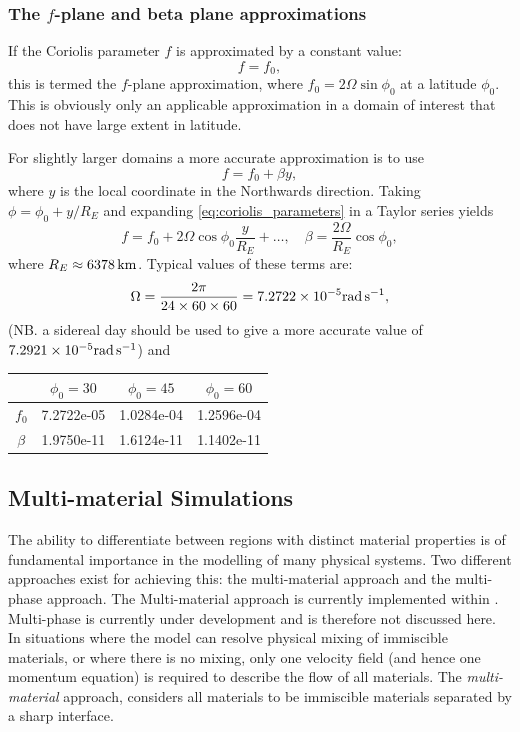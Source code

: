 \subsubsection{The $f$-plane and beta plane approximations}
If the Coriolis parameter $f$ is approximated by a constant value:
\begin{equation}\label{eq:f-plane}
f=f_0,
\end{equation}
this is termed the $f$-plane approximation, 
where $f_0 = 2\Omega\sin\phi_0$ at a latitude $\phi_0$.
This is obviously only an applicable approximation in a domain of interest 
that does not have large extent in latitude. 

For slightly larger domains a more accurate approximation is to use
\begin{equation}\label{eq:beta-plane}
f = f_0 + \beta y,
\end{equation}
where $y$ is the local coordinate in the Northwards direction.
Taking $\phi = \phi_0 + y/R_E$ and expanding \eqref{eq:coriolis_parameters} 
in a Taylor series yields
\begin{equation*}
f = f_0 +2\Omega\cos\phi_0\frac{y}{R_E}+\ldots,\quad \beta = \frac{2\Omega}{R_E}\cos\phi_0,
\end{equation*}
where $R_E\approx\unit[6378]{km}$. Typical values of these terms are: 
\begin{equation*}
\Omega = \frac{2\pi}{24\times 60\times 60} = 7.2722\times 10^{-5}\rads[],
\end{equation*}
(NB. a sidereal day should be used to give a more accurate value of $7.2921\times 10^{-5}\rads[]$)
and
\begin{center}\begin{small}
\begin{tabular}{c|ccc}
  &  $\phi_0 = 30$ & $\phi_0=45$ & $\phi_0 = 60$ \\  \hline
 $f_0$  & 7.2722e-05 & 1.0284e-04 & 1.2596e-04 \\
 $\beta$  & 1.9750e-11  &  1.6124e-11  &  1.1402e-11 \\
\end{tabular}\end{small}
\end{center}


\subsection{Multi-material Simulations}
The ability to differentiate between regions with distinct material properties is of fundamental importance in the modelling of many physical systems.  Two different approaches exist for achieving this: the multi-material approach and the multi-phase approach.  The Multi-material approach is currently implemented within \fluidity. Multi-phase is currently under development and is therefore not discussed here. 
In situations where the model can resolve physical mixing of immiscible materials, or where there is no mixing, only one velocity field (and hence one momentum equation) is required to describe the flow of all materials. The \emph{multi-material} approach, considers all materials to be immiscible materials separated by a sharp interface.


